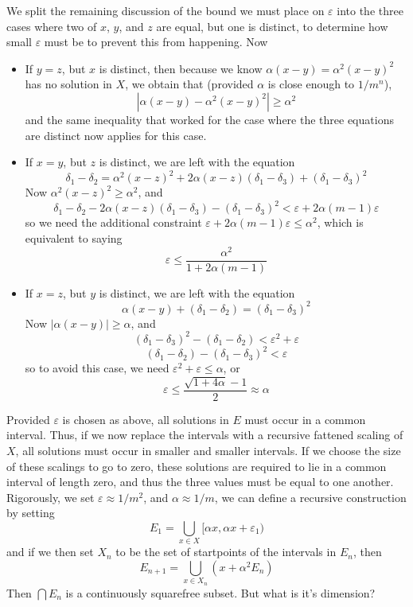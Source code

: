 \documentclass{report}
\theoremstyle{plain}
\theoremstyle{plain}
\begin{document}
We split the remaining discussion of the bound we must place on $\varepsilon$ into the three cases where two of $x$, $y$, and $z$ are equal, but one is distinct, to determine how small $\varepsilon$ must be to prevent this from happening. Now
%
\begin{itemize}
    \item If $y = z$, but $x$ is distinct, then because we know $\alpha(x - y) = \alpha^2(x - y)^2$ has no solution in $X$, we obtain that (provided $\alpha$ is close enough to $1/m^n$),
    \[ |\alpha(x - y) - \alpha^2(x-y)^2| \geq \alpha^2 \]
    and the same inequality that worked for the case where the three equations are distinct now applies for this case.

    \item If $x = y$, but $z$ is distinct, we are left with the equation
    \[ \delta_1 - \delta_2 = \alpha^2(x - z)^2 + 2\alpha(x - z)(\delta_1 - \delta_3) + (\delta_1 - \delta_3)^2 \]
    Now $\alpha^2(x - z)^2 \geq \alpha^2$, and
    \[ \delta_1 - \delta_2 - 2\alpha(x-z)(\delta_1 - \delta_3) - (\delta_1 - \delta_3)^2 < \varepsilon + 2\alpha(m-1)\varepsilon \]
    so we need the additional constraint $\varepsilon + 2\alpha(m-1)\varepsilon \leq \alpha^2$, which is equivalent to saying
    \[ \varepsilon \leq \frac{\alpha^2}{1 + 2\alpha(m-1)} \]

    \item If $x = z$, but $y$ is distinct, we are left with the equation
    \[ \alpha(x - y) + (\delta_1 - \delta_2) = (\delta_1 - \delta_3)^2 \]
    Now $|\alpha(x-y)| \geq \alpha$, and
    \[ (\delta_1 - \delta_3)^2 - (\delta_1 - \delta_2) < \varepsilon^2 + \varepsilon \]
    \[ (\delta_1 - \delta_2) - (\delta_1 - \delta_3)^2 < \varepsilon \]
    so to avoid this case, we need $\varepsilon^2 + \varepsilon \leq \alpha$, or
    \[ \varepsilon \leq \frac{\sqrt{1 + 4\alpha} - 1}{2} \approx \alpha \]
\end{itemize}
%
Provided $\varepsilon$ is chosen as above, all solutions in $E$ must occur in a common interval. Thus, if we now replace the intervals with a recursive fattened scaling of $X$, all solutions must occur in smaller and smaller intervals. If we choose the size of these scalings to go to zero, these solutions are required to lie in a common interval of length zero, and thus the three values must be equal to one another. Rigorously, we set $\varepsilon \approx 1/m^2$, and $\alpha \approx 1/m$, we can define a recursive construction by setting
%
\[ E_1 = \bigcup_{x \in X} [\alpha x, \alpha x + \varepsilon_1) \]
%
and if we then set $X_n$ to be the set of startpoints of the intervals in $E_n$, then
%
\[ E_{n+1} = \bigcup_{x \in X_n} (x + \alpha^2 E_n) \]
%
Then $\bigcap E_n$ is a continuously squarefree subset. But what is it's dimension?
\end{document}
